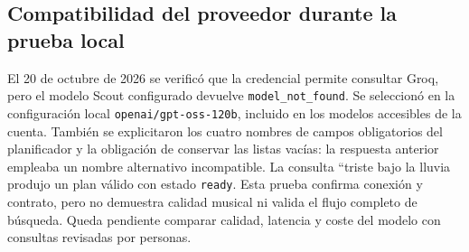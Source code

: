 \subsection{Compatibilidad del proveedor durante la prueba local}
El 20 de octubre de 2026 se verificó que la credencial permite consultar Groq, pero el modelo Scout configurado devuelve \texttt{model\_not\_found}. Se seleccionó en la configuración local \texttt{openai/gpt-oss-120b}, incluido en los modelos accesibles de la cuenta. También se explicitaron los cuatro nombres de campos obligatorios del planificador y la obligación de conservar las listas vacías: la respuesta anterior empleaba un nombre alternativo incompatible. La consulta ``triste bajo la lluvia produjo un plan válido con estado \texttt{ready}. Esta prueba confirma conexión y contrato, pero no demuestra calidad musical ni valida el flujo completo de búsqueda. Queda pendiente comparar calidad, latencia y coste del modelo con consultas revisadas por personas.

